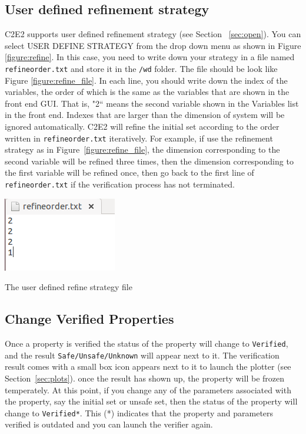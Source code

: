 \documentclass{tufte-book} %
\begin{document}
\subsection{User defined refinement strategy}\label{sec:refinement_defined}
C2E2 supports user defined refinement strategy (see Section ~\ref{sec:open}). You can select USER DEFINE STRATEGY from the drop down menu as shown in Figure \ref{figure:refine}. In this case, you need to write down your strategy in a file named \texttt{refineorder.txt} and store it in the \texttt{/wd} folder. The file should be look like Figure \ref{figure:refine_file}. In each line, you should write down the index of the variables, the order of which is the same as the variables that are shown in the front end GUI. That is, "2`` means the second variable shown in the Variables list in the front end. Indexes that are larger than the dimension of system will be ignored automatically. C2E2 will refine the initial set according to the order written in \texttt{refineorder.txt} iteratively. For example, if use the refinement strategy as in Figure~\ref{figure:refine_file}, the dimension corresponding to the second variable will be refined three times, then the dimension corresponding to the first variable will be refined once, then go back to the first line of \texttt{refineorder.txt} if the verification process has not terminated.

\begin{marginfigure}
 \centerline{\includegraphics[scale=.25,keepaspectratio=true]{Manual_ver0_2_image/refine_order.png}}
 \caption{The user defined refine strategy file} 
  \label{figure:refine_file}
\end{marginfigure}


\subsection{Change Verified Properties}
Once a property is verified the status of the property will change to \texttt{Verified}, and the result \texttt{Safe/Unsafe/Unknown} will appear next to it. The verification result comes with a small box icon appears next to it to launch the plotter (see Section~\ref{sec:plots}). once the result has shown up, the property will be frozen temperately. At this point, if you change any of the parameters associated with the property, say the initial set or unsafe set, then the status of the property will change to \texttt{Verified*}. This (*) indicates that the property and parameters verified is outdated and you can launch the verifier again.
\end{document}
